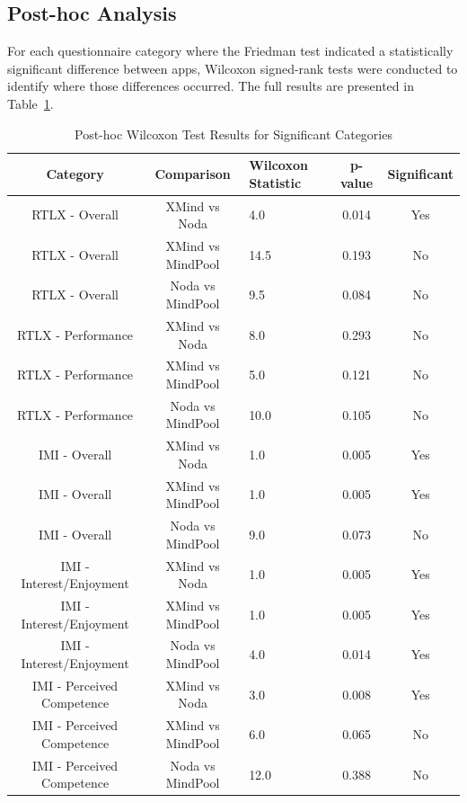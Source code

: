 \documentclass{CPP}
\begin{document}
\subsection{Post-hoc Analysis}

For each questionnaire category where the Friedman test indicated a statistically significant difference between apps, Wilcoxon signed-rank tests were conducted to identify where those differences occurred. The full results are presented in Table~\ref{tab:wilcoxon-results}.

\begin{table}[h!]
    \centering
    \caption{Post-hoc Wilcoxon Test Results for Significant Categories}
    \label{tab:wilcoxon-results}
    \begin{tabular}{|c|c|p{2cm}|c|c|}
        \hline
        \textbf{Category} & \textbf{Comparison} & \textbf{Wilcoxon Statistic} & \textbf{p-value} & \textbf{Significant} \\
        \hline
        RTLX - Overall & XMind vs Noda & 4.0 & 0.014 & Yes \\
        RTLX - Overall & XMind vs MindPool & 14.5 & 0.193 & No \\
        RTLX - Overall & Noda vs MindPool & 9.5 & 0.084 & No \\
        RTLX - Performance & XMind vs Noda & 8.0 & 0.293 & No \\
        RTLX - Performance & XMind vs MindPool & 5.0 & 0.121 & No \\
        RTLX - Performance & Noda vs MindPool & 10.0 & 0.105 & No \\
        IMI - Overall & XMind vs Noda & 1.0 & 0.005 & Yes \\
        IMI - Overall & XMind vs MindPool & 1.0 & 0.005 & Yes \\
        IMI - Overall & Noda vs MindPool & 9.0 & 0.073 & No \\
        IMI - Interest/Enjoyment & XMind vs Noda & 1.0 & 0.005 & Yes \\
        IMI - Interest/Enjoyment & XMind vs MindPool & 1.0 & 0.005 & Yes \\
        IMI - Interest/Enjoyment & Noda vs MindPool & 4.0 & 0.014 & Yes \\
        IMI - Perceived Competence & XMind vs Noda & 3.0 & 0.008 & Yes \\
        IMI - Perceived Competence & XMind vs MindPool & 6.0 & 0.065 & No \\
        IMI - Perceived Competence & Noda vs MindPool & 12.0 & 0.388 & No \\

\end{tabular}
\end{table}
\end{document}
